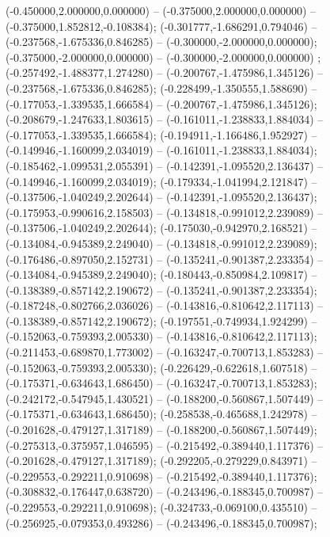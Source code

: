  (-0.450000,2.000000,0.000000) -- (-0.375000,2.000000,0.000000) -- (-0.375000,1.852812,-0.108384);
 (-0.301777,-1.686291,0.794046) -- (-0.237568,-1.675336,0.846285) -- (-0.300000,-2.000000,0.000000);
 (-0.375000,-2.000000,0.000000) -- (-0.300000,-2.000000,0.000000) ;
 (-0.257492,-1.488377,1.274280) -- (-0.200767,-1.475986,1.345126) -- (-0.237568,-1.675336,0.846285);
 (-0.228499,-1.350555,1.588690) -- (-0.177053,-1.339535,1.666584) -- (-0.200767,-1.475986,1.345126);
 (-0.208679,-1.247633,1.803615) -- (-0.161011,-1.238833,1.884034) -- (-0.177053,-1.339535,1.666584);
 (-0.194911,-1.166486,1.952927) -- (-0.149946,-1.160099,2.034019) -- (-0.161011,-1.238833,1.884034);
 (-0.185462,-1.099531,2.055391) -- (-0.142391,-1.095520,2.136437) -- (-0.149946,-1.160099,2.034019);
 (-0.179334,-1.041994,2.121847) -- (-0.137506,-1.040249,2.202644) -- (-0.142391,-1.095520,2.136437);
 (-0.175953,-0.990616,2.158503) -- (-0.134818,-0.991012,2.239089) -- (-0.137506,-1.040249,2.202644);
 (-0.175030,-0.942970,2.168521) -- (-0.134084,-0.945389,2.249040) -- (-0.134818,-0.991012,2.239089);
 (-0.176486,-0.897050,2.152731) -- (-0.135241,-0.901387,2.233354) -- (-0.134084,-0.945389,2.249040);
 (-0.180443,-0.850984,2.109817) -- (-0.138389,-0.857142,2.190672) -- (-0.135241,-0.901387,2.233354);
 (-0.187248,-0.802766,2.036026) -- (-0.143816,-0.810642,2.117113) -- (-0.138389,-0.857142,2.190672);
 (-0.197551,-0.749934,1.924299) -- (-0.152063,-0.759393,2.005330) -- (-0.143816,-0.810642,2.117113);
 (-0.211453,-0.689870,1.773002) -- (-0.163247,-0.700713,1.853283) -- (-0.152063,-0.759393,2.005330);
 (-0.226429,-0.622618,1.607518) -- (-0.175371,-0.634643,1.686450) -- (-0.163247,-0.700713,1.853283);
 (-0.242172,-0.547945,1.430521) -- (-0.188200,-0.560867,1.507449) -- (-0.175371,-0.634643,1.686450);
 (-0.258538,-0.465688,1.242978) -- (-0.201628,-0.479127,1.317189) -- (-0.188200,-0.560867,1.507449);
 (-0.275313,-0.375957,1.046595) -- (-0.215492,-0.389440,1.117376) -- (-0.201628,-0.479127,1.317189);
 (-0.292205,-0.279229,0.843971) -- (-0.229553,-0.292211,0.910698) -- (-0.215492,-0.389440,1.117376);
 (-0.308832,-0.176447,0.638720) -- (-0.243496,-0.188345,0.700987) -- (-0.229553,-0.292211,0.910698);
 (-0.324733,-0.069100,0.435510) -- (-0.256925,-0.079353,0.493286) -- (-0.243496,-0.188345,0.700987);
